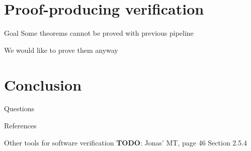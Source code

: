\documentclass[xcolor={x11names}]{beamer}
\begin{document}
\section{Proof-producing verification}

\begin{frame}{Goal}
    Some theorems cannot be proved with previous pipeline

    We would like to prove them anyway


\end{frame}


\section{Conclusion}

\begin{frame}
    \begin{center}
        \huge
        Questions
    \end{center}
\end{frame}


\appendix

\begin{frame}[allowframebreaks]{References}
    \nocite{*}
    
    
\end{frame}

\begin{frame}{Other tools for software verification}
    \textbf{TODO}: Jonas' MT, page 46 Section 2.5.4
\end{frame}
\end{document}
